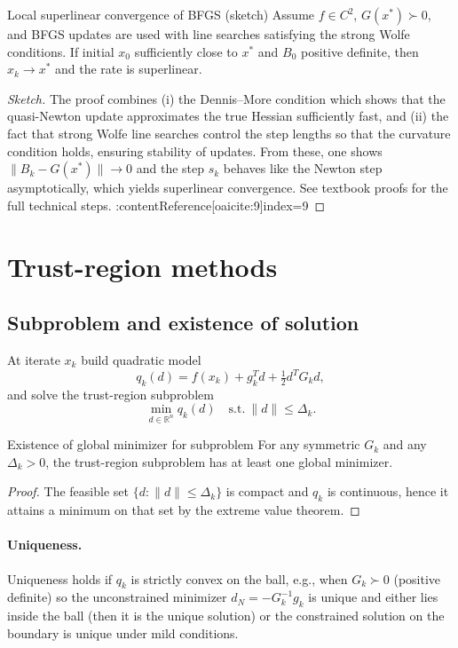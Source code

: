 \documentclass{MathNote}
\begin{document}
\begin{theorem}{Local superlinear convergence of BFGS (sketch)}{}
Assume \(f\in C^2\), \(G(x^*)\succ0\), and BFGS updates are used with line searches satisfying the strong Wolfe conditions. If initial \(x_0\) sufficiently close to \(x^*\) and \(B_0\) positive definite, then \(x_k\to x^*\) and the rate is superlinear.
\end{theorem}

\begin{proof}[Sketch]
The proof combines (i) the Dennis–More condition which shows that the quasi-Newton update approximates the true Hessian sufficiently fast, and (ii) the fact that strong Wolfe line searches control the step lengths so that the curvature condition holds, ensuring stability of updates. From these, one shows \(\|B_k-G(x^*)\|\to0\) and the step \(s_k\) behaves like the Newton step asymptotically, which yields superlinear convergence. See textbook proofs for the full technical steps. :contentReference[oaicite:9]{index=9}
\end{proof}

\section{Trust-region methods}

\subsection{Subproblem and existence of solution}
At iterate \(x_k\) build quadratic model
\[
q_k(d)=f(x_k)+g_k^T d+\tfrac12 d^T G_k d,
\]
and solve the trust-region subproblem
\[
\min_{d\in\mathbb{R}^n} q_k(d) \quad\text{s.t.}\ \|d\|\le\Delta_k.
\]

\begin{proposition}{Existence of global minimizer for subproblem}{}
For any symmetric \(G_k\) and any \(\Delta_k>0\), the trust-region subproblem has at least one global minimizer.
\end{proposition}
\begin{proof}
The feasible set \(\{d:\|d\|\le\Delta_k\}\) is compact and \(q_k\) is continuous, hence it attains a minimum on that set by the extreme value theorem.
\end{proof}

\paragraph{Uniqueness.} Uniqueness holds if \(q_k\) is strictly convex on the ball, e.g., when \(G_k\succ0\) (positive definite) so the unconstrained minimizer \(d_N=-G_k^{-1}g_k\) is unique and either lies inside the ball (then it is the unique solution) or the constrained solution on the boundary is unique under mild conditions.
\end{document}

